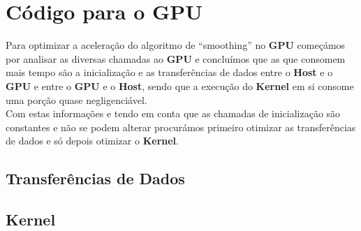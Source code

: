 \chapter{Código para o GPU}
Para optimizar a aceleração do algoritmo de ``smoothing'' no \textbf{GPU} começámos por analisar as diversas chamadas ao \textbf{GPU} e concluímos que as que consomem mais tempo são a inicialização e as transferências de dados entre o \textbf{Host} e o \textbf{GPU} e entre o \textbf{GPU} e o \textbf{Host}, sendo que a execução do \textbf{Kernel} em si consome uma porção quase negligenciável.\\

Com estas informações e tendo em conta que as chamadas de inicialização são constantes e não se podem alterar procurámos primeiro otimizar as transferências de dados e só depois otimizar o \textbf{Kernel}.

\section{Transferências de Dados}


\section{Kernel}

